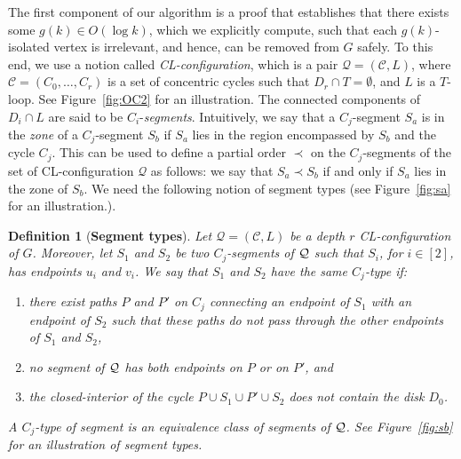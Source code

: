 \documentclass{article}
\newtheorem{definition}[theorem]{Definition}
\numberwithin{claimcounter}{lemma}
\begin{document}
The first component of our algorithm is a proof that establishes that there exists some $g(k)\in O (\log k)$, which we explicitly compute, such that each $g(k)$-isolated vertex is irrelevant, and hence, can be removed from $G$ safely. To this end, we use a notion called {\em CL-configuration}, which is a pair $\mathcal{Q}=(\mathcal{C},L)$, where $\mathcal{C} =(C_0,\ldots,C_r)$ is a set of concentric cycles such that $D_r\cap T =\emptyset$, and $L$ is a $T$-loop. See Figure~\ref{fig:OC2} for an illustration. The connected components of $D_i\cap L$ are said to be $C_i$-\textit{segments}. Intuitively, we say that a $C_j$-segment $S_a$ is in the \textit{zone} of a $C_j$-segment $S_b$ if $S_a$ lies in the region encompassed by $S_b$ and the cycle $C_j$. This can be used to define a partial order $\prec$ on the $C_j$-segments of the set of CL-configuration $\mathcal{Q}$ as follows: we say that $S_a \prec S_b $ if and only if $S_a$ lies in the zone of $S_b$. We need the following notion of segment types (see Figure~\ref{fig:sa} for an illustration.).
\begin{definition}[{\bf Segment types}]
  Let $\mathcal{Q}=(\mathcal{C},L)$ be a depth $r$  CL-configuration of $G$. Moreover, let $S_{1}$ and $S_{2}$ be two $C_j$-segments of ${\cal Q}$ such that $S_i$, for $i\in [2]$, has endpoints $u_i$ and $v_i$. We say that $S_{1}$ and $S_{2}$ have the {\em same $C_j$-type} if:
 \begin{enumerate}
     \item there exist paths $P$ and $P'$  on $C_j$
connecting an endpoint of $S_{1}$ with an endpoint of $S_{2}$ 
such that these paths do not pass through the other endpoints of $S_1$ and $S_2$, 
    \item no  segment of ${\cal Q}$ has both
endpoints on $P$ or on $P'$, and
\item the closed-interior of  the cycle $P\cup S_{1}\cup P'\cup S_{2}$ does not contain
the disk $D_{0}$. 
 \end{enumerate}
A \emph{$C_j$-type of segment} is an equivalence class of segments of ${\cal Q}$.   See Figure~\ref{fig:sb} for an illustration of segment types.
\end{definition}
\end{document}
